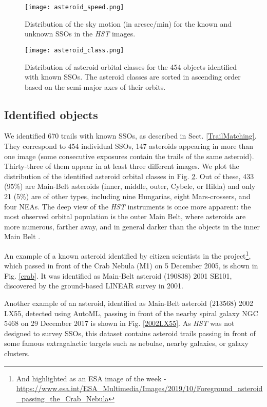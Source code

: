 \documentclass{aa}
\begin{document}
\begin{figure}
   \centering
   \texttt{[image: asteroid\_speed.png]}
   \caption{Distribution of the sky motion (in arcsec/min) for the known and unknown SSOs in the \textit{HST} images.}
    \label{speed}%
\end{figure}

\begin{figure}
   \centering
   \texttt{[image: asteroid\_class.png]}
   \caption{Distribution of asteroid orbital classes for the 454 objects identified with known SSOs. The asteroid classes are sorted in ascending order based on the semi-major axes of their orbits.}
    \label{classes}%
\end{figure}

\subsection{Identified objects}

We identified 670 trails with known SSOs, as described in Sect. \ref{TrailMatching}. They correspond to 454 individual SSOs, 147 asteroids appearing in more than one image (some consecutive exposures contain the trails of the same asteroid). Thirty-three of them appear in at least three different images. We plot the distribution of the identified asteroid orbital classes in Fig. \ref{classes}. Out of these, 433 (95\%) are Main-Belt asteroids (inner, middle, outer, Cybele, or Hilda) and only 21 (5\%) are of other types, including nine Hungarias, eight Mars-crossers, and four NEAs. The deep view of the \textit{HST} instruments is once more apparent: the most observed orbital population is the outer Main Belt, where asteroids are more numerous, farther away, and in general darker than the objects in the inner Main Belt \citep{DeMeoCarry2014}.

An example of a known asteroid identified by citizen scientists in the project\footnote{And highlighted as an ESA image of the week - \url{https://www.esa.int/ESA_Multimedia/Images/2019/10/Foreground\_asteroid\_passing\_the\_Crab_Nebula}}, which passed in front of the Crab Nebula (M1) on 5 December 2005, is shown in Fig. \ref{crab}. It was identified as Main-Belt asteroid (190838) 2001 SE101, discovered by the ground-based LINEAR survey in 2001.

Another example of an asteroid, identified as Main-Belt asteroid (213568) 2002 LX55, detected using AutoML, passing in front of the nearby spiral galaxy NGC 5468 on 29 December 2017 is shown in Fig. \ref{2002LX55}. As \textit{HST} was not designed to survey SSOs, this dataset contains asteroid trails passing in front of some famous extragalactic targets such as nebulae, nearby galaxies, or galaxy clusters. 
\end{document}
